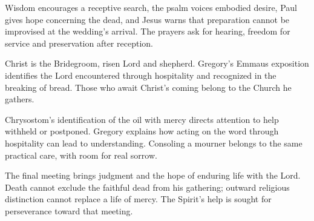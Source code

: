 \begin{fourSenses}
\item[Literal.] Wisdom encourages a receptive search, the psalm voices embodied desire, Paul gives hope concerning the dead, and Jesus warns that preparation cannot be improvised at the wedding's arrival. The prayers ask for hearing, freedom for service and preservation after reception.
\item[Allegorical.] Christ is the Bridegroom, risen Lord and shepherd. Gregory's Emmaus exposition identifies the Lord encountered through hospitality and recognized in the breaking of bread. Those who await Christ's coming belong to the Church he gathers.
\item[Moral.] Chrysostom's identification of the oil with mercy directs attention to help withheld or postponed. Gregory explains how acting on the word through hospitality can lead to understanding. Consoling a mourner belongs to the same practical care, with room for real sorrow.
\item[Anagogical.] The final meeting brings judgment and the hope of enduring life with the Lord. Death cannot exclude the faithful dead from his gathering; outward religious distinction cannot replace a life of mercy. The Spirit's help is sought for perseverance toward that meeting.
\end{fourSenses}

